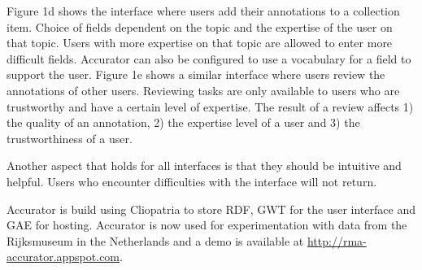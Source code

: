 Figure 1d shows the interface where users add their annotations to a collection item. Choice of fields dependent on the topic and the expertise of the user on that topic. Users with more expertise on that topic are allowed to enter more difficult fields. Accurator can also be configured to use a vocabulary for a field to support the user. Figure 1e shows a similar interface where users review the annotations of other users. Reviewing tasks are only available to users who are trustworthy and have a certain level of expertise. The result of a review affects 1) the quality of an annotation, 2) the expertise level of a user and 3) the trustworthiness of a user.

Another aspect that holds for all interfaces is that they should be intuitive and helpful. Users who encounter difficulties with the interface will not return. 

Accurator is build using Cliopatria to store RDF, GWT for the user interface and GAE for hosting. Accurator is now used for experimentation with data from the Rijksmuseum in the Netherlands and a demo is available at \url{http://rma-accurator.appspot.com}.



